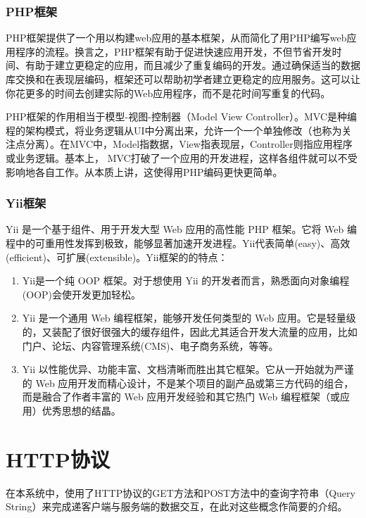 \subsubsection{PHP框架}

PHP框架提供了一个用以构建web应用的基本框架，从而简化了用PHP编写web应用程序的流程。换言之，PHP框架有助于促进快速应用开发，不但节省开发时间、有助于建立更稳定的应用，而且减少了重复编码的开发。通过确保适当的数据库交换和在表现层编码，框架还可以帮助初学者建立更稳定的应用服务。这可以让你花更多的时间去创建实际的Web应用程序，而不是花时间写重复的代码。

PHP框架的作用相当于模型-视图-控制器（Model View Controller）。MVC是种编程的架构模式，将业务逻辑从UI中分离出来，允许一个一个单独修改（也称为关注点分离）。在MVC中，Model指数据，View指表现层，Controller则指应用程序或业务逻辑。基本上， MVC打破了一个应用的开发进程，这样各组件就可以不受影响地各自工作。从本质上讲，这使得用PHP编码更快更简单。

\subsubsection{Yii框架}

Yii 是一个基于组件、用于开发大型 Web 应用的高性能 PHP 框架。它将 Web 编程中的可重用性发挥到极致，能够显著加速开发进程。Yii代表简单(easy)、高效(efficient)、可扩展(extensible)。Yii框架的的特点：

\begin{enumerate}
\item Yii是一个纯 OOP 框架。对于想使用 Yii 的开发者而言，熟悉面向对象编程(OOP)会使开发更加轻松。
\item Yii 是一个通用 Web 编程框架，能够开发任何类型的 Web 应用。它是轻量级的，又装配了很好很强大的缓存组件，因此尤其适合开发大流量的应用，比如门户、论坛、内容管理系统(CMS)、电子商务系统，等等。
\item Yii 以性能优异、功能丰富、文档清晰而胜出其它框架。它从一开始就为严谨的 Web 应用开发而精心设计，不是某个项目的副产品或第三方代码的组合，而是融合了作者丰富的 Web 应用开发经验和其它热门 Web 编程框架（或应用）优秀思想的结晶。
\end{enumerate}

\section{HTTP协议}
在本系统中，使用了HTTP协议的GET方法和POST方法中的查询字符串（Query String）来完成递客户端与服务端的数据交互，在此对这些概念作简要的介绍。

